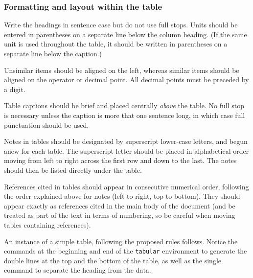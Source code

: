 \documentclass{cernyrep}
\begin{document}
\subsubsection{Formatting and layout within the table}

Write the headings in sentence case but do not use full stops. Units
should be entered in parentheses on a separate line below the column
heading. (If the same unit is used throughout the table, it should be
written in parentheses on a separate line below the caption.)

Unsimilar items should be aligned on the left, whereas similar items
should be aligned on the operator or decimal point. All decimal points
must be preceded by a digit.


Table captions should be brief and placed centrally \emph{above} the
table. No full stop is necessary unless the caption is more that one
sentence long, in which case full punctuation should be used. 


Notes in tables should be designated by superscript lower-case
letters, and begun anew for each table. The superscript letter should
be placed in alphabetical order moving from left to right across the
first row and down to the last. The notes should then be listed
directly under the table.

References cited in tables should appear in consecutive numerical
order, following the order explained above for notes (left to right,
top to bottom).  They should appear exactly as references cited in the
main body of the document (and be treated as part of the text in terms
of numbering, so be careful when moving tables containing references).


An instance of a simple table, following the proposed rules follows.
Notice the  commands at the beginning and end of the
\texttt{tabular} environment to generate the double lines at the top
and the bottom of the table, as well as the single  command
to separate the heading from the data.
\end{document}
